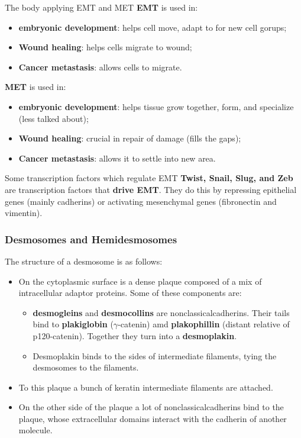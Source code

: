 \documentclass[../main.tex]{subfiles}
\begin{document}
\begin{RemarkWithTitel}{The body applying EMT and MET}
	\textbf{EMT} is used in:
	\begin{itemize}
		\item \textbf{embryonic development}: helps cell move, adapt to for new cell gorups;
		\item \textbf{Wound healing}: helps cells migrate to wound;
		\item \textbf{Cancer metastasis}: allows cells to migrate.
	\end{itemize}
	\textbf{MET} is used in:
	\begin{itemize}
		\item \textbf{embryonic development}: helps tissue grow together, form, and specialize (less talked about);
		\item \textbf{Wound healing}: crucial in repair of damage (fills the gaps);
		\item \textbf{Cancer metastasis}: allows it to settle into new area.
	\end{itemize}
\end{RemarkWithTitel}

\begin{RemarkWithTitel}{Some transcription factors which regulate EMT}
	\textbf{\gls{Twist}, \gls{Snail}, \gls{Slug}, and \gls{Zeb}} are transcription factors that \textbf{drive EMT}. They do this by repressing epithelial genes (mainly cadherins) or activating mesenchymal genes (\gls{fibronectin} and \gls{vimentin}).
\end{RemarkWithTitel}

\subsubsection{Desmosomes and Hemidesmosomes}
\label{sec:demso}

The structure of a desmosome is as follows:
\begin{itemize}
	\item On the cytoplasmic surface is a dense plaque composed of a mix of intracellular adaptor proteins. Some of these components are:
	\begin{itemize}
		\item \textbf{\gls{desmogleins}} and \textbf{\gls{desmocollins}} are \gls{nonclassicalcadherins}. Their tails bind to \textbf{\gls{plakiglobin}} ($\gamma$-catenin) amd \textbf{plakophillin} (distant relative of p120-catenin). Together they turn into a \textbf{desmoplakin}.
		\item Desmoplakin binds to the sides of intermediate filaments, tying the \gls{desmosomes} to the filaments.
	\end{itemize}
	\item To this plaque a bunch of keratin intermediate filaments are attached.
	\item On the other side of the plaque a lot of \gls{nonclassicalcadherins} bind to the plaque, whose extracellular domains interact with the \gls{cadherin} of another molecule.
\end{itemize}
\end{document}
